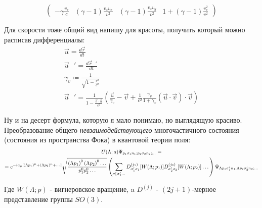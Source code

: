 \documentclass[12pt]{article}
\begin{document}
\begin{large}
\begin{equation}
\begin{pmatrix}
            -\gamma\frac{v_z}{c} & \left( \gamma - 1 \right)\frac{v_z v_x}{v^2} & \left( \gamma - 1 \right)\frac{v_z v_y}{v^2} & 1 + \left( \gamma - 1 \right)\frac{v_z^2}{v^2}
        \end{pmatrix}
    \end{equation}
    \par Для скорости тоже общий вид напишу для красоты, получить который можно расписав дифференциалы:
    \begin{equation}
    \begin{gathered}
        \vec{u} = \frac{d\vec{r}}{dt} \\
        \vec{u}\text{ }' = \frac{d\vec{r}\text{ }'}{dt} \\
        \gamma_v \coloneqq \frac{1}{\sqrt{1 - \frac{v^2}{c^2}}} \\
        \vec{u}\text{ }' = \frac{1}{1 - \frac{\vec{v} \cdot \vec{u}}{c^2}}\left( \frac{\vec{u}}{\gamma_v} -\vec{v} + \frac{1}{c^2}\frac{\gamma_v}{1 + \gamma_v}\left( \vec{u} \cdot \vec{v} \right) \cdot \vec{v} \right)
    \end{gathered}
    \end{equation}
    \par Ну и на десерт формула, которую я мало понимаю, но выглядящую красиво. Преобразование общего \textsl{невзаимодействующего} многочастичного состояния (состояния из пространства Фока) в квантовой теории поля:
    \begin{equation}
    \begin{normalsize}
    \begin{gathered}
        U(\Lambda; a)\Psi_{p_1\sigma_1 n_1;p_2\sigma_2 n_2;\dots} = \\
        = e^{-ia_\mu\left[ \left( \Lambda p_1 \right)^\mu + \left( \Lambda p_2 \right)^\mu + \dots \right]}\sqrt{\frac{\left( \Lambda p_1 \right)^0 \left( \Lambda p_2 \right)^0 \dots}{p_1^0 p_2^0 \dots}}\left( \sum\limits_{\sigma'_1 \sigma'_2 \dots} D_{\sigma'_1 \sigma_1}^{(j_1)}[W(\Lambda; p_1)] D_{\sigma'_2 \sigma_2}^{(j_2)}[W(\Lambda; p_2)] \dots\right)\Psi_{\Lambda p_1\sigma'_1 n_1;\Lambda p_2\sigma'_2 n_2;\dots}
    \end{gathered}
    \end{normalsize}
    \end{equation}
    \par Где $W(\Lambda; p)$ - вигнеровское вращение, a $D^{(j)}$ - $(2 j + 1)$-мерное представление группы $SO(3)$.
\end{large}
\end{document}
